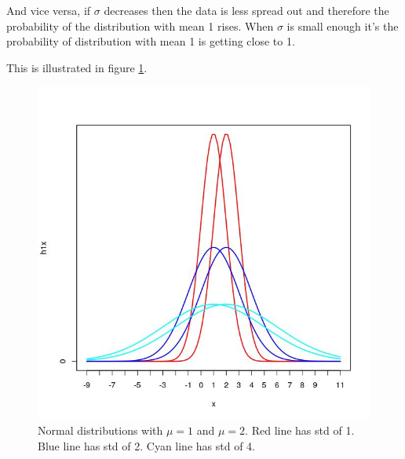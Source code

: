 \documentclass[11pt]{amsart}
\begin{document}
And vice versa, if $\sigma$ decreases then the data is less spread out and therefore the probability of the distribution with mean 1 rises. When $\sigma$ is small enough it's the probability of distribution with mean 1 is getting close to 1.

This is illustrated in figure \ref{fig:3-c}.

\begin{figure}[ht!]
  \includegraphics[width=\linewidth]{3-c}
  \caption{Normal distributions with $\mu = 1$ and $\mu = 2$. Red line has std of 1. Blue line has std of 2. Cyan line has std of 4.}
  \label{fig:3-c}
\end{figure}
\end{document}
